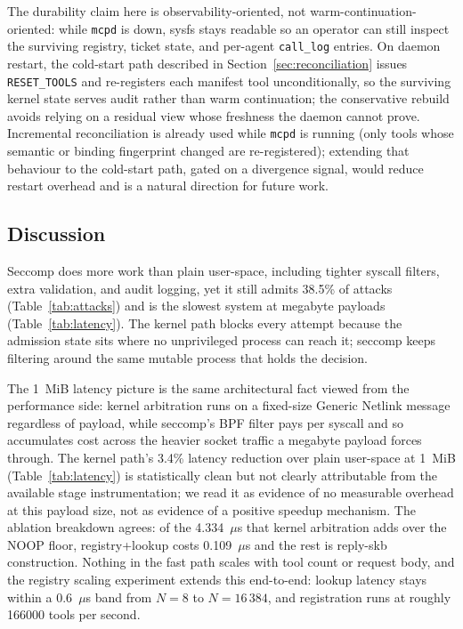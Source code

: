 The durability claim here is observability-oriented, not warm-continuation-oriented: while \texttt{mcpd} is down, sysfs stays readable so an operator can still inspect the surviving registry, ticket state, and per-agent \texttt{call\_\allowbreak log} entries.
On daemon restart, the cold-start path described in Section~\ref{sec:reconciliation} issues \texttt{RESET\_\allowbreak TOOLS} and re-registers each manifest tool unconditionally, so the surviving kernel state serves audit rather than warm continuation; the conservative rebuild avoids relying on a residual view whose freshness the daemon cannot prove.
Incremental reconciliation is already used while \texttt{mcpd} is running (only tools whose semantic or binding fingerprint changed are re-registered); extending that behaviour to the cold-start path, gated on a divergence signal, would reduce restart overhead and is a natural direction for future work.


\subsection{Discussion}

Seccomp does more work than plain user-space, including tighter syscall filters, extra validation, and audit logging, yet it still admits \num{38.5}\% of attacks (Table~\ref{tab:attacks}) and is the slowest system at megabyte payloads (Table~\ref{tab:latency}).
The kernel path blocks every attempt because the admission state sits where no unprivileged process can reach it; seccomp keeps filtering around the same mutable process that holds the decision.

The 1~MiB latency picture is the same architectural fact viewed from the performance side: kernel arbitration runs on a fixed-size Generic Netlink message regardless of payload, while seccomp's BPF filter pays per syscall and so accumulates cost across the heavier socket traffic a megabyte payload forces through.
The kernel path's 3.4\% latency reduction over plain user-space at 1~MiB (Table~\ref{tab:latency}) is statistically clean but not clearly attributable from the available stage instrumentation; we read it as evidence of no measurable overhead at this payload size, not as evidence of a positive speedup mechanism.
The ablation breakdown agrees: of the \num{4.334}~$\mu$s that kernel arbitration adds over the NOOP floor, registry+lookup costs \num{0.109}~$\mu$s and the rest is reply-skb construction.
Nothing in the fast path scales with tool count or request body, and the registry scaling experiment extends this end-to-end: lookup latency stays within a \num{0.6}~$\mu$s band from $N = 8$ to $N = 16\,384$, and registration runs at roughly \num{166000} tools per second.


